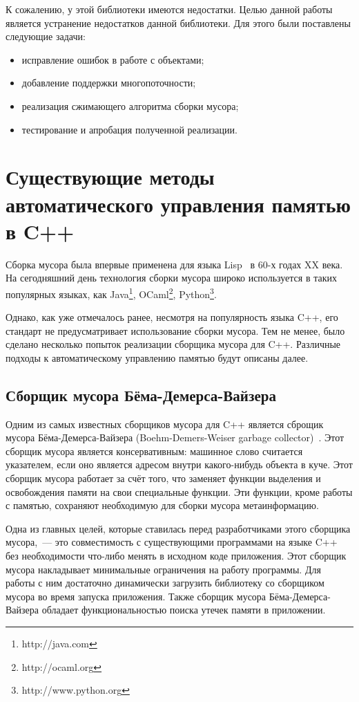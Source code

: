 К сожалению, у этой библиотеки имеются недостатки. Целью данной работы является устранение недостатков данной библиотеки. Для этого были поставлены следующие задачи: 
\begin{itemize}
\item исправление ошибок в работе с объектами; 
\item добавление поддержки многопоточности;
\item реализация сжимающего алгоритма сборки мусора;
\item тестирование и апробация полученной реализации.
\end{itemize}


\section{Существующие методы автоматического управления памятью в C++}
Сборка мусора была впервые применена для языка Lisp~\cite{lisp} в 60-х годах XX века. На сегодняшний день технология сборки мусора широко используется в таких популярных языках, как Java\footnote{http://java.com}, OCaml\footnote{http://ocaml.org}, Python\footnote{http://www.python.org}.

Однако, как уже отмечалось ранее, несмотря на популярность языка C++, его стандарт не предусматривает использование сборки мусора. Тем не менее, было сделано несколько попыток реализации сборщика мусора для C++. Различные подходы к автоматическому управлению памятью будут описаны далее.

\subsection{Сборщик мусора Бёма-Демерса-Вайзера}
Одним из самых известных сборщиков мусора для C++ является сброщик мусора Бёма-Демерса-Вайзера (Boehm-Demers-Weiser garbage collector)~\cite{boehm1, boehm2, boehm3}. Этот сборщик мусора является консервативным: машинное слово считается указателем, если оно является адресом внутри какого-нибудь объекта в куче. Этот сборщик мусора работает за счёт того, что заменяет функции выделения и освобождения памяти на свои специальные функции. Эти функции, кроме работы с памятью, сохраняют необходимую для сборки мусора метаинформацию.

Одна из главных целей, которые ставилась перед разработчиками этого сборщика мусора,~--- это совместимость с существующими программами на языке C++ без необходимости что-либо менять в исходном коде приложения. Этот сборщик  мусора накладывает минимальные ограничения на работу программы. Для работы с ним достаточно динамически загрузить библиотеку со сборщиком мусора во время запуска приложения. Также сборщик мусора Бёма-Демерса-Вайзера обладает функциональностью поиска утечек памяти в приложении.

